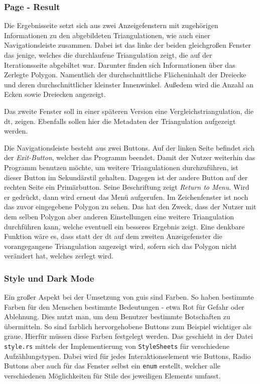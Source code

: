 \subsubsection{Page - Result}

Die Ergebnisseite setzt sich aus zwei Anzeigefenstern mit zugehörigen Informationen zu den abgebildeten Triangulationen, wie auch einer Navigationsleiste zusammen.
Dabei ist das linke der beiden gleichgroßen Fenster das jenige, welches die durchlaufene Triangulation zeigt, die auf der Iterationsseite abgebiltet war. Darunter finden sich 
Informationen über das Zerlegte Polygon. Namentlich der durchschnittliche Flächeninhalt der Dreiecke und deren durchschnittlicher kleinster Innenwinkel. Außedem wird die Anzahl an Ecken sowie Dreiecken angezeigt.

Das zweite Fenster soll in einer späteren Version eine Vergleichstriangulation, die \ac{dt}, zeigen. Ebenfalls sollen hier die Metadaten der Triangulation aufgezeigt werden.

Die Navigationsleiste besteht aus zwei Buttons. Auf der linken Seite befindet sich der \emph{Exit-Button}, welcher das Programm beendet. Damit der Nutzer weiterhin das Programm benutzen möchte, um weitere Triangulationen durchzuführen,
ist dieser Button im Sekundärstil gehalten.
Dagegen ist der andere Button auf der rechten Seite ein Primärbutton. Seine Beschriftung zeigt \emph{Return to Menu}. Wird er gedrückt, dann wird erneut das Menü aufgerufen. Im Zeichenfenster ist noch das zuvor eingegebene Polygon zu sehen.
Das hat den Zweck, dass der Nutzer mit dem selben Polygon aber anderen Einstellungen eine weitere Triangulation durchführen kann, welche eventuell ein besseres Ergebnis zeigt.
Eine denkbare Funktion wäre es, dass statt der \ac{dt} auf dem zweiten Anzeigefenster die vorangegangene Triangulation angezeigt wird, sofern sich das Polygon nicht verändert hat, welches zerlegt wird.


\subsubsection{Style und Dark Mode}
Ein großer Aspekt bei der Umsetzung von \ac{gui}s sind Farben. So haben bestimmte Farben für den Menschen bestimmte Bedeutungen - etwa Rot für Gefahr oder Ablehnung.
Dies nutzt man, um dem Benutzer bestimmte Botschaften zu übermitteln. So sind farblich hervorgehobene Buttons zum Beispiel wichtiger als graue. Hierfür müssen diese Farben festgelegt werden.
Das geschieht in der Datei \lstinline{style.rs} mittels der Implementierung von \lstinline{StyleSheets} für verschiedene Aufzählungstypen.
Dabei wird für jedes Interaktionselement wie Buttons, Radio Buttons aber auch für das Fenster selbst ein \lstinline{enum} erstellt, welcher alle verschiedenen Möglichkeiten für Stile des jeweiligen Elements 
umfasst. 

